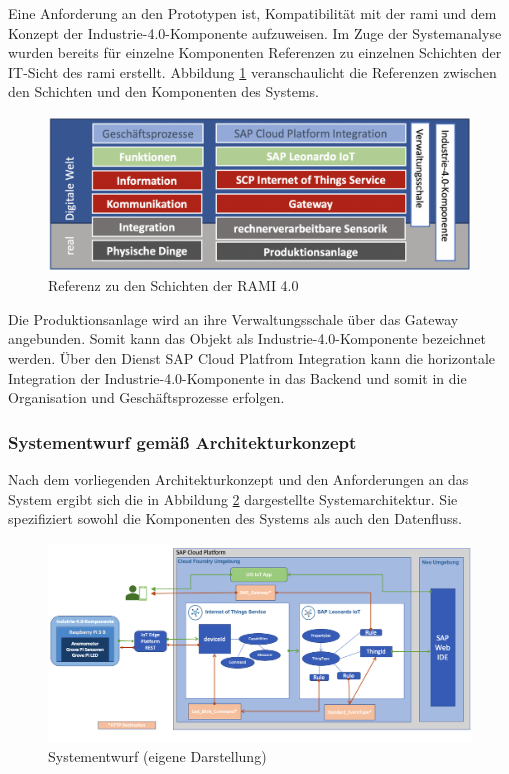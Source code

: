 Eine Anforderung an den Prototypen ist,  Kompatibilität mit der \ac{rami} und dem Konzept der Industrie-4.0-Komponente aufzuweisen. Im Zuge der Systemanalyse wurden bereits für einzelne Komponenten Referenzen zu einzelnen Schichten der IT-Sicht des \ac{rami} erstellt. Abbildung \ref{ramicustom} veranschaulicht die Referenzen zwischen den Schichten und den Komponenten des Systems.

\begin{figure}[H]
  \centering
  \includegraphics[width=1.0\linewidth]{pictures/ramicustom}
  \caption[Referenz zu den Schichten der RAMI 4.0]{Referenz zu den Schichten der RAMI 4.0}
  \label{ramicustom}
\end{figure}
 \noindent Die Produktionsanlage wird an ihre Verwaltungsschale über das Gateway angebunden. Somit kann das Objekt als Industrie-4.0-Komponente bezeichnet werden. Über den Dienst SAP Cloud Platfrom Integration kann die horizontale Integration der Industrie-4.0-Komponente in das Backend und somit in die Organisation und Geschäftsprozesse erfolgen.

\subsubsection{Systementwurf gemäß Architekturkonzept}

Nach dem vorliegenden Architekturkonzept und den Anforderungen an das System ergibt sich die in Abbildung \ref{systemcustom} dargestellte Systemarchitektur. Sie spezifiziert sowohl die Komponenten des Systems als auch den Datenfluss.
\begin{figure}[H]
  \centering
  \includegraphics[angle=90, scale=0.4]{pictures/systemcustom}
  \caption[Systementwurf]{Systementwurf (eigene Darstellung)}
  \label{systemcustom}
\end{figure}


